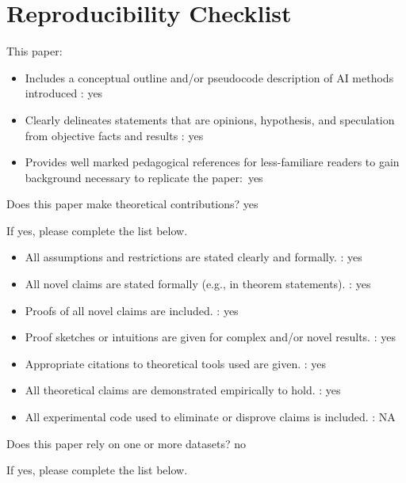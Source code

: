 \section{Reproducibility Checklist}
This paper:
\begin{itemize}
\item Includes a conceptual outline and/or pseudocode description of AI methods introduced : yes
\item Clearly delineates statements that are opinions, hypothesis, and speculation from objective facts and results : yes
\item Provides well marked pedagogical references for less-familiare readers to gain background necessary to replicate the paper:~yes
\end{itemize}

\noindent Does this paper make theoretical contributions? yes

\noindent If yes, please complete the list below.

\begin{itemize}
\item All assumptions and restrictions are stated clearly and formally. : yes
\item All novel claims are stated formally (e.g., in theorem statements). : yes %
\item Proofs of all novel claims are included. : yes %
\item Proof sketches or intuitions are given for complex and/or novel results. : yes %
\item Appropriate citations to theoretical tools used are given. : yes %
\item All theoretical claims are demonstrated empirically to hold. : yes %
\item All experimental code used to eliminate or disprove claims is included. : NA %
\end{itemize}

\noindent Does this paper rely on one or more datasets? no %

\noindent If yes, please complete the list below.

